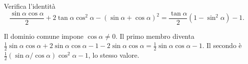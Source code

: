 
\begin{esercizio}
Verifica l'identit\`a
    \[
    \frac{\sin\alpha\cos\alpha}{2}
    +2\tan\alpha\cos^2\alpha
    -(\sin\alpha+\cos\alpha)^2
    =
    \frac{\tan\alpha}{2}\left(1-\sin^2\alpha\right)-1.
    \]
\end{esercizio}

\begin{soluzione}
Il dominio comune impone $\cos\alpha\ne0$.
Il primo membro diventa $\tfrac12\sin\alpha\cos\alpha+2\sin\alpha\cos\alpha
-1-2\sin\alpha\cos\alpha=\tfrac12\sin\alpha\cos\alpha-1$.
Il secondo è $\tfrac12(\sin\alpha/\cos\alpha)\cos^2\alpha-1$, lo stesso valore.
\end{soluzione}
